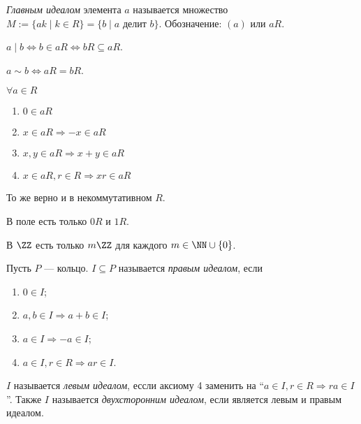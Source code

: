 \documentclass[12pt,a4paper]{article}
\begin{document}
    \begin{definition}
        \emph{Главным идеалом} элемента $a$ называется множество $M := \{ak \mid k \in R\} = \{b \mid a \text{ делит } b\}$. Обозначение: $(a)$ или $aR$.
    \end{definition}

    \begin{statement}
        $a \mid b \Leftrightarrow b \in aR \Leftrightarrow bR \subseteq aR$. 
    \end{statement}

    \begin{statement}
        $a \sim b \Leftrightarrow aR = bR$.
    \end{statement}

    \begin{statement}$\forall a \in R$
        \begin{enumerate}
            \item $0 \in aR$
            \item $x \in aR \Rightarrow -x \in aR$
            \item $x, y \in aR \Rightarrow x + y \in aR$
            \item $x \in aR, r \in R \Rightarrow xr \in aR$
        \end{enumerate}
    \end{statement}

    \begin{remark}
        То же верно и в некоммутативном $R$.
    \end{remark}

    \begin{example}
        В поле есть только $0R$ и $1R$.
    \end{example}

    \begin{example}
        В $\ZZ$ есть только $m\ZZ$ для каждого $m \in \NN \cup \{0\}$.
    \end{example}

    \begin{definition}
        Пусть $P$ --- кольцо. $I\subseteq P$ называется \emph{правым идеалом}, если
        \begin{enumerate}
            \item $0 \in I$;
            \item $a, b \in I \Rightarrow a + b \in I$;
            \item $a \in I \Rightarrow -a \in I$;
            \item $a \in I, r \in R \Rightarrow ar \in I$.
        \end{enumerate}
        $I$ называется \emph{левым идеалом}, ессли аксиому 4 заменить на ``$a \in I, r \in R \Rightarrow ra \in I$''. Также $I$ называется \emph{двухсторонним идеалом}, если является левым и правым идеалом.
    \end{definition}
\end{document}
